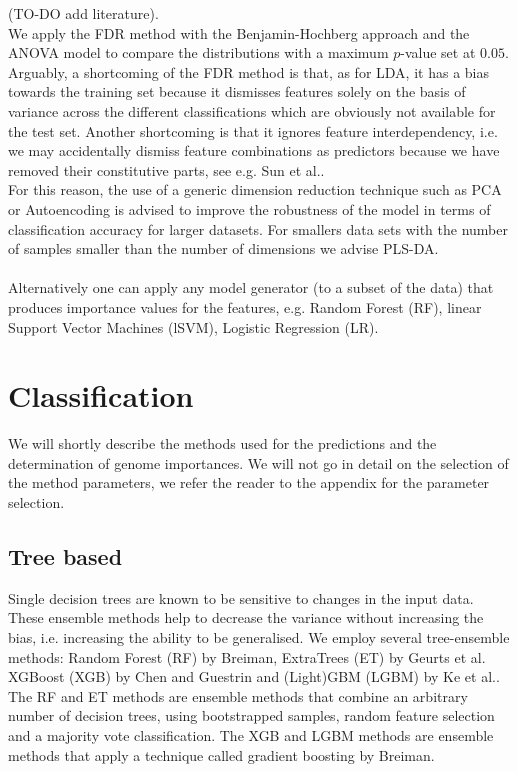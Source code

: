 \documentclass[a4paper,10pt]{article}
\begin{document}
(TO-DO add literature). \\
We apply the FDR method with the Benjamin-Hochberg approach and the ANOVA model to compare the distributions with a maximum $p$-value set at $0.05$. \\ %
%
Arguably, a shortcoming of the FDR method is that, as for LDA, it has a bias towards the training set because it dismisses features solely
on the basis of variance across the different classifications which are obviously not available for the test set. Another shortcoming is that it ignores
feature interdependency, i.e. we may accidentally dismiss feature combinations as predictors because we have removed their constitutive parts, see
e.g. Sun et al.\cite{Sun1996}. \\ 
%
For this reason, the use of a generic dimension reduction technique such as PCA or Autoencoding is advised to improve
the robustness of the model in terms of classification accuracy for larger datasets. For smallers data sets with the number of samples smaller
than the number of dimensions we advise PLS-DA. \\ \\
%
Alternatively one can apply any model generator (to a subset of the data) that produces importance values for the features, e.g. Random Forest (RF), linear Support
Vector Machines (lSVM), Logistic Regression (LR). 
\section{Classification}
%
We will shortly describe the methods used for the predictions and the determination of genome importances.
We will not go in detail on the selection of the method parameters, we refer the reader to the appendix for the
parameter selection.

\subsection{Tree based}

Single decision trees are known to be sensitive to changes in the input data. These ensemble methods 
help to decrease the variance without increasing the bias, i.e. increasing the ability to be generalised.
We employ several tree-ensemble methods: Random Forest (RF) by Breiman\cite{Breiman2001}, ExtraTrees (ET) by Geurts et al.\cite{Geurts2006} 
XGBoost (XGB) by Chen and Guestrin\cite{Chen2016} and (Light)GBM (LGBM) by Ke et al.\cite{Ke2017}.
The RF and ET methods are ensemble methods that combine an arbitrary number of decision trees, using bootstrapped samples,
random feature selection and a majority vote classification. The XGB and LGBM methods are ensemble methods 
that apply a technique called gradient boosting by Breiman\cite{Breiman1997}.
%
\end{document}
